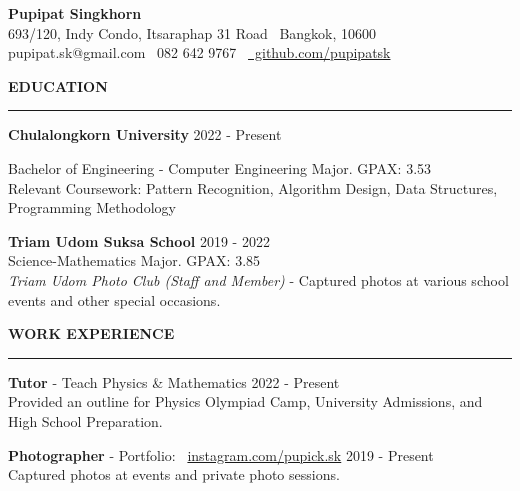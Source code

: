 \documentclass[11pt]{article}
\begin{document}
\begin{center}
    {\Large \textbf{Pupipat Singkhorn}}\\
    693/120, Indy Condo, Itsaraphap 31 Road \textbullet \ Bangkok, 10600 \\
    pupipat.sk@gmail.com \textbullet \ 082 642 9767 \textbullet\ \href{https://github.com/pupipatsk}{\faGithub\ github.com/pupipatsk}
\end{center}
\textbf{EDUCATION}
\vspace{5pt}
{\color{NavyBlue}\hrule}
\vspace{9pt}
\textbf{Chulalongkorn University} \hfill 2022 - Present

\hspace*{7pt} Bachelor of Engineering - Computer Engineering Major. GPAX: 3.53\\
\hspace*{7pt} Relevant Coursework: Pattern Recognition, Algorithm Design, Data Structures, Programming Methodology

\vspace{6pt}

\textbf{Triam Udom Suksa School} \hfill 2019 - 2022\\
\hspace*{7pt} Science-Mathematics Major. GPAX: 3.85\\
\hspace*{7pt} \textit{Triam Udom Photo Club (Staff and Member)} - Captured photos at various school events and other special occasions.

\vspace{12pt}
\textbf{WORK EXPERIENCE}
\vspace{5pt}
{\color{NavyBlue}\hrule}
\vspace{9pt}
\textbf{Tutor} - Teach Physics \& Mathematics \hfill 2022 - Present\\
\hspace*{7pt} Provided an outline for Physics Olympiad Camp, University Admissions, and High School Preparation.

\vspace{6pt}

\textbf{Photographer} - Portfolio: \faInstagram\ \href{https://www.instagram.com/pupick.sk}{instagram.com/pupick.sk} \hfill 2019 - Present\\
\hspace*{7pt} Captured photos at events and private photo sessions.
\end{document}
